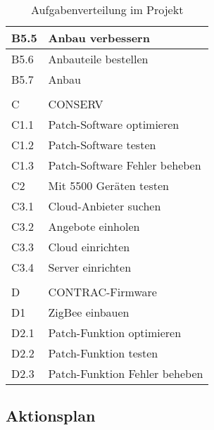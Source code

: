 \begin{table}[H]
\begin{center}
\begin{tabular}{l|l}
            B5.5 & Anbau verbessern                                    \\ \hline
            B5.6 & Anbauteile bestellen                                \\ \hline
            B5.7 & Anbau                                               \\ \hline
            &                                                     \\ \hline
            C    & CONSERV                                             \\ \hline
            C1.1 & Patch-Software optimieren                           \\ \hline
            C1.2 & Patch-Software testen                               \\ \hline
            C1.3 & Patch-Software Fehler beheben                       \\ \hline
            C2   & Mit 5500 Geräten testen                             \\ \hline
            C3.1 & Cloud-Anbieter suchen                               \\ \hline
            C3.2 & Angebote einholen                                   \\ \hline
            C3.3 & Cloud einrichten                                    \\ \hline
            C3.4 & Server einrichten                                   \\ \hline
            &                                                     \\ \hline
            D    & CONTRAC-Firmware                                    \\ \hline
            D1   & ZigBee einbauen                                     \\ \hline
            D2.1 & Patch-Funktion optimieren                           \\ \hline
            D2.2 & Patch-Funktion testen                               \\ \hline
            D2.3 & Patch-Funktion Fehler beheben                       \\
        \end{tabular}
        \caption{Aufgabenverteilung im Projekt}
    \end{center}
\end{table}
\subsection{Aktionsplan}



